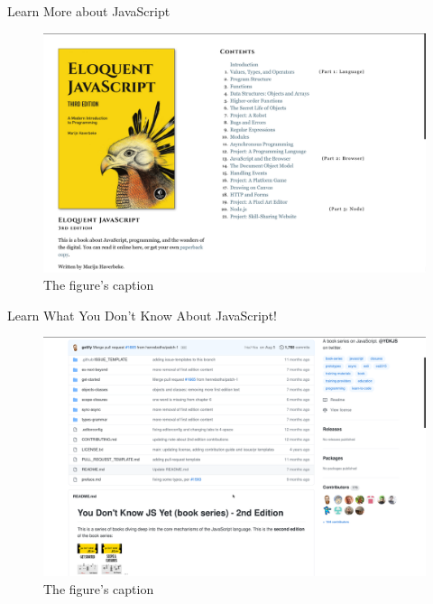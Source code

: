 \documentclass[14pt,aspectratio=169]{beamer}
\begin{document}
%
\begin{frame}{Learn More about JavaScript}
  \begin{figure}
    \centering
    \includegraphics[scale=.085]{images/eloquent-javascript.png}
    \caption{The figure's caption}
  \end{figure}
\end{frame}

%
\begin{frame}{Learn What You Don't Know About JavaScript!}
  \begin{figure}
    \centering
    \includegraphics[scale=.085]{images/dont-know-javascript.png}
    \caption{The figure's caption}
  \end{figure}
\end{frame}
\end{document}
